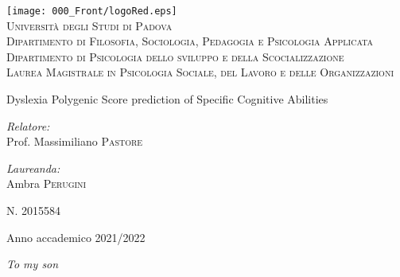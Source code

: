 \begin{titlepage} 
\begin{center}
\texttt{[image: 000\_Front/logoRed.eps]}
\\
\vspace{0.25cm}
\textsc{\Large Università degli Studi di Padova}\\
\vspace{0.50cm}
\textsc{\large Dipartimento di Filosofia, Sociologia, Pedagogia e Psicologia Applicata}\\
\textsc{\large Dipartimento di Psicologia dello sviluppo e della Scocializzazione}\\
\vspace{0.50cm} 
\textsc{\large Laurea Magistrale in Psicologia Sociale, del Lavoro e delle Organizzazioni}\hspace{0.8cm}\\
  
\vspace{1.50cm}
\huge \doublespacing \bfseries \begin{spacing}{1}{Dyslexia Polygenic Score prediction of Specific Cognitive Abilities}\end{spacing}
\vfill
\begin{minipage}[c]{0.48\linewidth}
    \begin{flushleft} \large
    \emph{Relatore:} \\
    Prof. Massimiliano \textsc{Pastore}
\end{flushleft}
\end{minipage}%
\hfill%
\begin{minipage}[c]{0.48\linewidth}
    \begin{flushright} \large
    \emph{Laureanda:}\\
    Ambra \textsc{Perugini}

    \textsc{N. 2015584}
    \end{flushright}
    \vfill
\end{minipage}


\vfill
 
{\small Anno accademico 2021/2022} 
\end{center}



\null\newpage
\cleardoublepage
\begin{flushright}
\null{}
\emph{
To my son}
\null
\end{flushright}







\end{titlepage}
